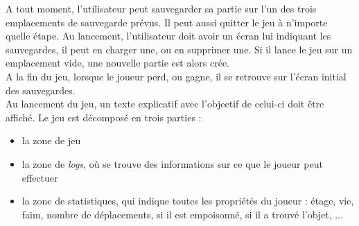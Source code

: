 \documentclass[11pt]{report}
\begin{document}
	\vspace{12pt}

	A tout moment, l'utilisateur peut sauvegarder sa partie sur l'un des trois emplacements de sauvegarde prévus. Il peut aussi quitter le jeu à n'importe quelle étape. Au lancement, l'utilisateur doit avoir un écran lui indiquant les sauvegardes, il peut en charger une, ou en supprimer une. Si il lance le jeu sur un emplacement vide, une nouvelle partie est alors crée.\\
	A la fin du jeu, lorsque le joueur perd, ou gagne, il se retrouve sur l'écran initial des sauvegardes.\\
	Au lancement du jeu, un texte explicatif avec l'objectif de celui-ci doit être affiché. Le jeu est décomposé en trois parties :
	\begin{itemize}
	\item la zone de jeu
	\item la zone de \emph{logs}, où se trouve des informations sur ce que le joueur peut effectuer
	\item la zone de statistiques, qui indique toutes les propriétés du joueur : étage, vie, faim, nombre de déplacements, si il est empoisonné, si il a trouvé l'objet, ...
	\end{itemize}
	
	
\end{document}
